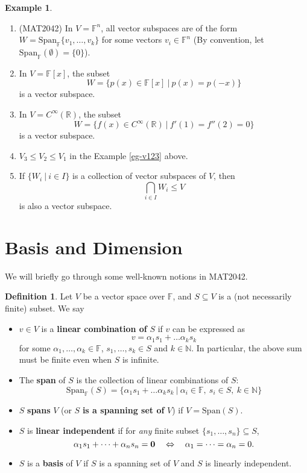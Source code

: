 \documentclass[11pt,openany]{book}
\theoremstyle{plain}
\theoremstyle{definition}
\newtheorem{definition}[definition]{Definition}
\newtheorem{example}[example]{Example}
\theoremstyle{remark}
\begin{document}
\begin{example} \
    \begin{enumerate}
        \item (MAT2042) In $V = \mathbb{F}^n$, all vector subspaces are of the form $W = \mathrm{Span}_{\mathbb{F}}\{v_1, \dots, v_k\}$ for some vectors $v_i \in \mathbb{F}^n$ (By convention, let $\mathrm{Span}_{\mathbb{F}}(\emptyset)=\{0\}$).
        \item In $V = \mathbb{F}[x]$, the subset 
        $$W = \{p(x) \in \mathbb{F}[x]\ |\ p(x) = p(-x)\}$$ 
        is a vector subspace.
        \item In $V = C^{\infty}(\mathbb{R})$, the subset 
        $$W = \{f(x) \in C^{\infty}(\mathbb{R}) \ |\ f'(1) = f''(2) = 0\}$$ 
        is a vector subspace.
        \item $V_3 \leq V_2 \leq V_1$ in the Example \ref{eg-v123} above.
        \item If $\{W_i\ |\ i \in I\}$ is a collection of vector subspaces of $V$, then $$\bigcap_{i \in I} W_i \leq V$$ is also a vector subspace.
    \end{enumerate}
\end{example}

\section{Basis and Dimension}
We will briefly go through some well-known notions in MAT2042.

\begin{definition}\label{vspace-notions}
    Let $V$ be a vector space over $\mathbb{F}$, and $S \subseteq V$ is a (not necessarily finite) subset. We say
    \begin{itemize}
        \item $v \in V$ is a {\bf linear combination of} $S$ if $v$ can be expressed as
        $$v = \alpha_1 s_1 + \dots \alpha_k s_k$$
        for some $\alpha_1, \dots, \alpha_k \in \mathbb{F}$, $s_1, \dots, s_k \in S$ and $k \in \mathbb{N}$. In particular, the above sum must be finite even when $S$ is infinite.
        \item The {\bf span} of $S$ is the collection of linear combinations of $S$:
        $$\mathrm{Span}_{\mathbb{F}}(S) = \{\alpha_1 s_1 + \dots \alpha_k s_k\ |\ \alpha_i \in \mathbb{F},\ s_i \in S,\ k \in \mathbb{N}\}$$
        \item $S$ {\bf spans} $V$ (or $S$ {\bf is a spanning set of} $V$) if $V = \mathrm{Span}(S)$.
        \item $S$ is {\bf linear independent} if for {\it any} finite subset 
        $\{s_1, \dots, s_n\} \subseteq S$, 
        $$\alpha_1s_1 + \dots + \alpha_ns_n = {\bf 0} \quad \Leftrightarrow \quad \alpha_1 = \dots = \alpha_n = 0.$$
        \item $S$ is a {\bf basis} of $V$ if $S$ is a spanning set of $V$ and $S$ is linearly independent.
    \end{itemize}
\end{definition}
\end{document}
